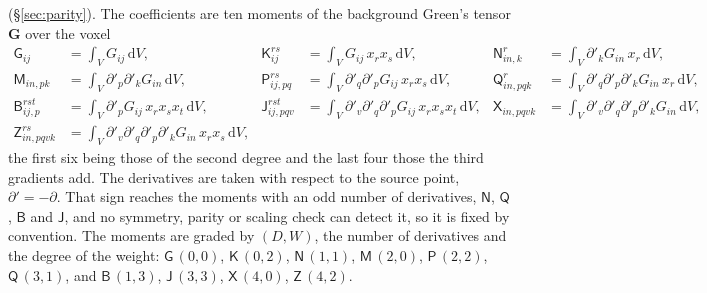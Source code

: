 \documentclass[preprint,review,12pt]{elsarticle}
\newcommand{\bG}{\mathbf{G}}
\newcommand{\dd}{\mathrm{d}}
\begin{document}
(\S\ref{sec:parity}). The coefficients are ten moments of the background Green's tensor $\bG$ over
the voxel
\begin{equation}\label{eq:moments}
\begin{aligned}
\mathsf G_{ij}&=\int_V G_{ij}\,\dd V, &
\mathsf K^{rs}_{ij}&=\int_V G_{ij}\,x_rx_s\,\dd V, &
\mathsf N^{r}_{in,k}&=\int_V \partial'_kG_{in}\,x_r\,\dd V,\\
\mathsf M_{in,pk}&=\int_V \partial'_p\partial'_kG_{in}\,\dd V, &
\mathsf P^{rs}_{ij,pq}&=\int_V \partial'_q\partial'_pG_{ij}\,x_rx_s\,\dd V, &
\mathsf Q^{r}_{in,pqk}&=\int_V \partial'_q\partial'_p\partial'_kG_{in}\,x_r\,\dd V,\\
\mathsf B^{rst}_{ij,p}&=\int_V \partial'_pG_{ij}\,x_rx_sx_t\,\dd V, &
\mathsf J^{rst}_{ij,pqv}&=\int_V \partial'_v\partial'_q\partial'_pG_{ij}\,x_rx_sx_t\,\dd V, &
\mathsf X_{in,pqvk}&=\int_V \partial'_v\partial'_q\partial'_p\partial'_kG_{in}\,\dd V,\\
\mathsf Z^{rs}_{in,pqvk}&=\int_V \partial'_v\partial'_q\partial'_p\partial'_kG_{in}\,x_rx_s\,\dd V,
\end{aligned}
\end{equation}
the first six being those of the second degree and the last four those the third gradients add. The
derivatives are taken with respect to the source point, $\partial'=-\partial$. That sign reaches
the moments with an odd number of derivatives, $\mathsf N$, $\mathsf Q$, $\mathsf B$ and $\mathsf J$,
and no symmetry, parity or scaling check can detect it, so it is fixed by convention. The moments are
graded by $(D,W)$, the number of derivatives and the degree of the weight: $\mathsf G\,(0,0)$,
$\mathsf K\,(0,2)$, $\mathsf N\,(1,1)$, $\mathsf M\,(2,0)$, $\mathsf P\,(2,2)$, $\mathsf Q\,(3,1)$,
and $\mathsf B\,(1,3)$, $\mathsf J\,(3,3)$, $\mathsf X\,(4,0)$, $\mathsf Z\,(4,2)$.
\end{document}
